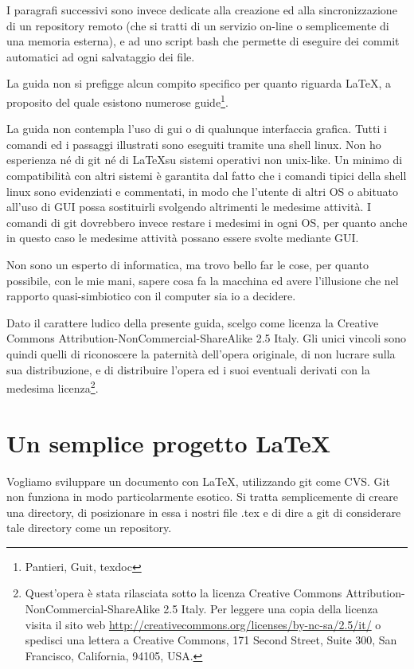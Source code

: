 \documentclass[a4paper,12pt,oneside]{article}
\begin{document}
I paragrafi successivi sono invece dedicate alla creazione ed alla
sincronizzazione di un repository remoto (che si tratti di un servizio on-line
o semplicemente di una memoria esterna), e ad uno script bash che permette di
eseguire dei commit automatici ad ogni salvataggio dei file.

La guida non si prefigge alcun compito specifico per quanto riguarda \LaTeX, a
proposito del quale esistono numerose guide\footnote{Pantieri, Guit, 
texdoc}.

La guida non contempla l'uso di gui o di qualunque interfaccia grafica. Tutti i
comandi ed i passaggi illustrati sono eseguiti tramite una shell linux.
Non ho esperienza né di git né di \LaTeX su sistemi operativi non
unix-like. Un minimo di compatibilità con altri sistemi è garantita dal fatto
che i comandi tipici della shell linux sono evidenziati e commentati, in modo
che l'utente di altri OS o abituato all'uso di GUI possa sostituirli svolgendo
altrimenti le medesime attività. I comandi di git dovrebbero invece restare i
medesimi in ogni OS, per quanto anche in questo caso le medesime attività
possano essere svolte mediante GUI.

Non sono un esperto di informatica, ma trovo bello far le cose, per quanto
possibile, con le mie mani, sapere cosa fa la macchina ed avere l'illusione che
nel rapporto quasi-simbiotico con il computer sia io a decidere.

Dato il carattere ludico della presente guida, scelgo come licenza la Creative
Commons Attribution-NonCommercial-ShareAlike 2.5 Italy. Gli unici vincoli sono
quindi quelli di riconoscere la paternità dell'opera
originale, di non lucrare sulla sua distribuzione, e di distribuire l'opera ed
i suoi eventuali derivati con la medesima licenza\footnote{
Quest'opera è stata rilasciata sotto la licenza
Creative Commons Attribution-NonCommercial-ShareAlike 2.5 Italy.
Per leggere una copia della licenza visita il sito web
\url{http://creativecommons.org/licenses/by-nc-sa/2.5/it/}
o spedisci una lettera a Creative Commons, 171 Second Street, Suite 300, San
Francisco, California, 94105, USA.}.

\section{Un semplice progetto \LaTeX}
Vogliamo sviluppare un documento con \LaTeX, utilizzando git come CVS.
Git non funziona in modo particolarmente esotico. Si tratta semplicemente di
creare una directory, di posizionare in essa i nostri file .tex e di dire a git
di considerare tale directory come un repository.
\end{document}
